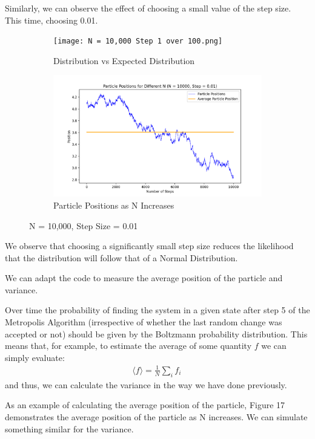 \documentclass[12pt]{article}
\begin{document}
Similarly, we can observe the effect of choosing a small value of the step size. This time, choosing 0.01.

\begin{figure}[h]
\begin{subfigure}{0.5\textwidth}
\texttt{[image: N = 10,000 Step 1 over 100.png]} 
\caption{Distribution vs Expected Distribution}
\label{fig:subim1}
\end{subfigure}
\begin{subfigure}{0.5\textwidth}
\includegraphics[width=1.05\linewidth]{1 over 100 particle position.png}
\caption{Particle Positions as N Increases}
\label{fig:subim2}
\end{subfigure}
\caption{N = 10,000, Step Size = 0.01}
\label{fig:image2}
\end{figure}

We observe that choosing a significantly small step size reduces the likelihood that the distribution will follow that of a Normal Distribution. 

We can adapt the code to measure the average position of the particle and variance.

Over time the probability of finding the system in a given state after step 5 of the Metropolis Algorithm (irrespective of whether the last random change was accepted or not) should be given by the Boltzmann probability distribution. This means that, for example, to estimate the average of some quantity $f$ we can simply evaluate:
 \begin{align} 
\langle f \rangle = \frac{1}{N}\sum_{i}^{} f_{i}\,
\end{align}
and thus, we can calculate the variance in the way we have done previously. 

As an example of calculating the average position of the particle, Figure 17 demonstrates the average position of the particle as N increases. We can simulate something similar for the variance.
\end{document}
